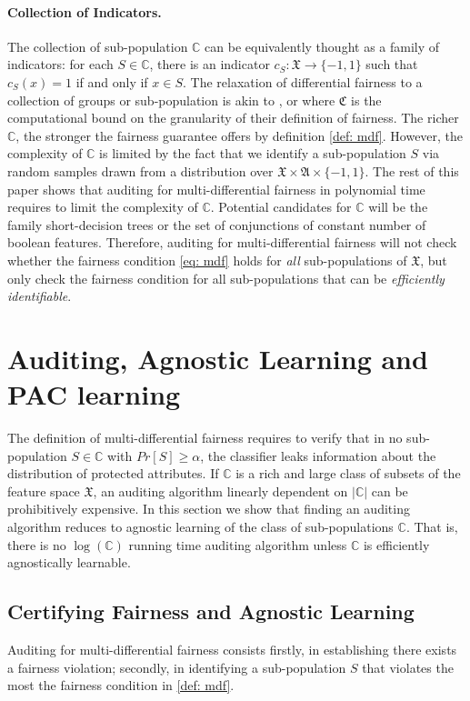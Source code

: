 \documentclass{article}
\begin{document}
\paragraph{Collection of Indicators.}
The collection of sub-population $\mathbb{C}$ can be equivalently thought as a family of indicators: for each $S\in \mathbb{C}$, there is an indicator $c_{S}: \mathfrak{X}\rightarrow \{-1, 1\}$ such that $c_{S}(x)=1$ if and only if $x\in S$. The relaxation of differential fairness to a collection of groups or sub-population is akin to \cite{kim2018fairness}, \cite{kearns2017preventing} or \cite{hebert2017calibration} where $\mathfrak{C}$ is the computational bound on the granularity of their definition of fairness. The richer $\mathbb{C}$, the stronger the fairness guarantee offers by definition \ref{def: mdf}. However, the complexity of $\mathbb{C}$ is limited by the fact that we identify a sub-population $S$ via random samples drawn from a distribution over $\mathfrak{X} \times \mathfrak{A}\times \{-1, 1\}$. The rest of this paper shows that auditing for multi-differential fairness in polynomial time requires to limit the complexity of $\mathbb{C}$. Potential candidates for $\mathbb{C}$ will be the family short-decision trees or the set of conjunctions of constant number of boolean features. Therefore, auditing for multi-differential fairness will not check whether the fairness condition \eqref{eq: mdf} holds for \textit{all} sub-populations of $\mathfrak{X}$, but only check  the fairness condition for all sub-populations that can be \textit{efficiently identifiable}. 

\section{Auditing, Agnostic Learning and PAC learning}

The definition of multi-differential fairness requires to verify that in no sub-population $S\in \mathbb{C}$ with $Pr[S]\geq \alpha$, the classifier leaks information about the distribution of protected attributes. If $\mathbb{C}$ is a rich and large class of subsets of the feature space $\mathfrak{X}$, an auditing algorithm linearly dependent on $|\mathbb{C}|$ can be prohibitively expensive. In this section we show that finding an auditing algorithm reduces to agnostic learning of the class of sub-populations $\mathbb{C}$. That is, there is no $\log(\mathbb{C})$ running time auditing algorithm unless $\mathbb{C}$ is efficiently agnostically learnable.  

\subsection{Certifying Fairness and Agnostic Learning}
Auditing for multi-differential fairness consists firstly, in establishing there exists a fairness violation; secondly, in identifying a sub-population $S$ that violates the most the fairness condition in \ref{def: mdf}. 
\end{document}
